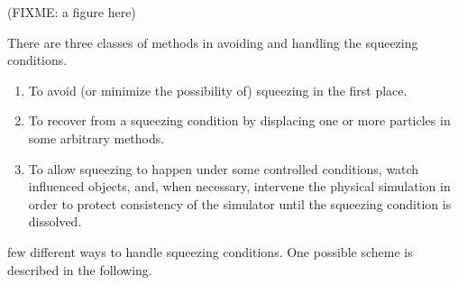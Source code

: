 \documentclass[english]{article}
\begin{document}
(FIXME: a figure here)

There are three classes of methods in avoiding and handling the squeezing
conditions.

\begin{enumerate}
\item To avoid (or minimize the possibility of) squeezing in the first place.

\item To recover from a squeezing condition by displacing one or more
  particles in some arbitrary methods.

\item To allow squeezing to happen under some controlled conditions,
  watch influenced objects, and, when necessary, intervene the
  physical simulation in order to protect consistency of the simulator
  until the squeezing condition is dissolved.
\end{enumerate}


few different ways to handle squeezing conditions.  One
possible scheme is described in the following.
\end{document}
